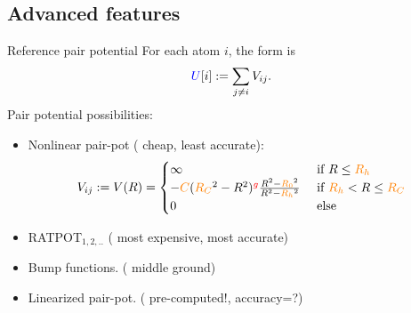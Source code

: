 \documentclass{beamer}
\begin{document}
\subsection{Advanced features}
\begin{frame}{Reference pair potential}
    For each atom $i$, the form is
    \begin{equation}
        {\color{blue}U}[i] := \sum_{j \neq i}V_{ij}.
    \end{equation}
    Pair potential possibilities:
    \begin{itemize}
        \item Nonlinear pair-pot ({\color{blue} cheap, least accurate}):
        \begin{equation}
            V_{ij} := V(R) = 
            \begin{cases}
                \infty & \text{ if }R \leq {\color{orange}R_h} \\
                -{\color{orange}C}({\color{orange}R_C}^2 - R^2)^{\color{red}g}\frac{R^2 - {\color{orange}R_0}^2}{R^2 - {\color{orange}R_h}^2} & \text{ if } {\color{orange}R_h} < R \leq {\color{orange}R_C} \\
                0 & \text{ else}
            \end{cases}
        \end{equation}
        \item RATPOT$_{1,2,..}$ ({\color{blue} most expensive, most accurate})
        \item Bump functions. ({\color{blue} middle ground})
        \item Linearized pair-pot. (\color{blue} pre-computed!, accuracy=?)
    \end{itemize}
\end{frame}
\end{document}
